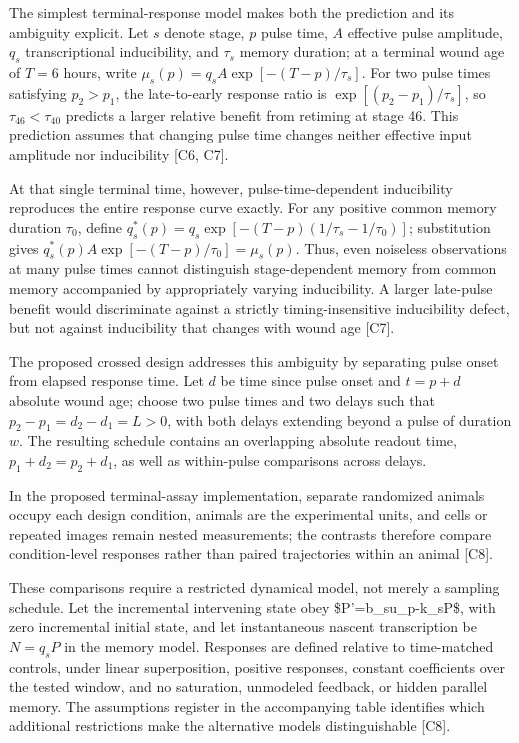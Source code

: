 \documentclass[11pt]{article}
\begin{document}
The simplest terminal-response model makes both the prediction and its ambiguity explicit. Let $s$ denote stage, $p$ pulse time, $A$ effective pulse amplitude, $q_s$ transcriptional inducibility, and $\tau_s$ memory duration; at a terminal wound age of $T=6$ hours, write $\mu_s(p)=q_sA\exp[-(T-p)/\tau_s]$. For two pulse times satisfying $p_2>p_1$, the late-to-early response ratio is $\exp[(p_2-p_1)/\tau_s]$, so $\tau_{46}<\tau_{40}$ predicts a larger relative benefit from retiming at stage 46. This prediction assumes that changing pulse time changes neither effective input amplitude nor inducibility [C6, C7].

At that single terminal time, however, pulse-time-dependent inducibility reproduces the entire response curve exactly. For any positive common memory duration $\tau_0$, define $q_s^*(p)=q_s\exp[-(T-p)(1/\tau_s-1/\tau_0)]$; substitution gives $q_s^*(p)A\exp[-(T-p)/\tau_0]=\mu_s(p)$. Thus, even noiseless observations at many pulse times cannot distinguish stage-dependent memory from common memory accompanied by appropriately varying inducibility. A larger late-pulse benefit would discriminate against a strictly timing-insensitive inducibility defect, but not against inducibility that changes with wound age [C7].

The proposed crossed design addresses this ambiguity by separating pulse onset from elapsed response time. Let $d$ be time since pulse onset and $t=p+d$ absolute wound age; choose two pulse times and two delays such that $p_2-p_1=d_2-d_1=L>0$, with both delays extending beyond a pulse of duration $w$. The resulting schedule contains an overlapping absolute readout time, $p_1+d_2=p_2+d_1$, as well as within-pulse comparisons across delays.

In the proposed terminal-assay implementation, separate randomized animals occupy each design condition, animals are the experimental units, and cells or repeated images remain nested measurements; the contrasts therefore compare condition-level responses rather than paired trajectories within an animal [C8].

These comparisons require a restricted dynamical model, not merely a sampling schedule. Let the incremental intervening state obey \$P'=b\_su\_p-k\_sP\$, with zero incremental initial state, and let instantaneous nascent transcription be $N=q_sP$ in the memory model. Responses are defined relative to time-matched controls, under linear superposition, positive responses, constant coefficients over the tested window, and no saturation, unmodeled feedback, or hidden parallel memory. The assumptions register in the accompanying table identifies which additional restrictions make the alternative models distinguishable [C8].
\end{document}
